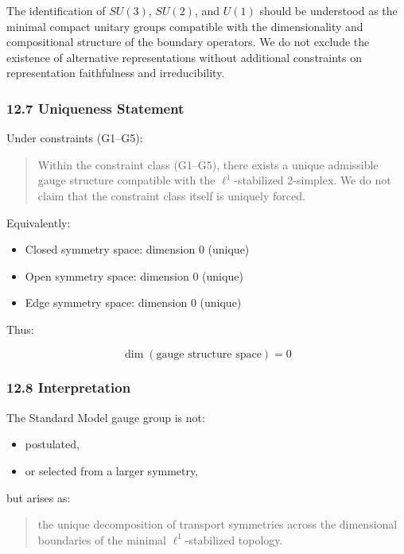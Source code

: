 \documentclass[
]{article}
\providecommand{\tightlist}{%
  \setlength{\itemsep}{0pt}\setlength{\parskip}{0pt}}
\begin{document}
The identification of \(SU(3)\), \(SU(2)\), and \(U(1)\) should be
understood as the minimal compact unitary groups compatible with the
dimensionality and compositional structure of the boundary operators. We
do not exclude the existence of alternative representations without
additional constraints on representation faithfulness and
irreducibility.

\subsubsection{12.7 Uniqueness Statement}\label{uniqueness-statement-1}

Under constraints (G1--G5):

\begin{quote}
Within the constraint class (G1--G5), there exists a unique admissible
gauge structure compatible with the \(\ell^1\)-stabilized 2-simplex. We
do not claim that the constraint class itself is uniquely forced.
\end{quote}

Equivalently:

\begin{itemize}
\tightlist
\item
  Closed symmetry space: dimension 0 (unique)
\item
  Open symmetry space: dimension 0 (unique)
\item
  Edge symmetry space: dimension 0 (unique)
\end{itemize}

Thus:

\[
\dim(\text{gauge structure space}) = 0
\]

\subsubsection{12.8 Interpretation}\label{interpretation-3}

The Standard Model gauge group is not:

\begin{itemize}
\tightlist
\item
  postulated,
\item
  or selected from a larger symmetry,
\end{itemize}

but arises as:

\begin{quote}
the unique decomposition of transport symmetries across the dimensional
boundaries of the minimal \(\ell^1\)-stabilized topology.
\end{quote}
\end{document}
